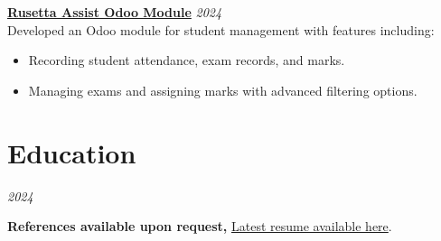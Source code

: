 \documentclass[letterpaper, 10pt]{article}
\begin{document}
\noindent\textbf{\href{https://github.com/mahmoudElshimi/rusetta_assist}{Rusetta Assist Odoo Module}} \hfill \textit{2024} \\
Developed an Odoo module for student management with features including:
\begin{itemize}[leftmargin=*]
    \item Recording student attendance, exam records, and marks.
    \item Managing exams and assigning marks with advanced filtering options.
\end{itemize}

\section*{Education}
\vspace{-0.3cm}
\hfill \textit{2024} 
\vspace{0.35cm}

\noindent \textbf{References available upon request,} \href{https://raw.githubusercontent.com/mahmoudElshimi/resume/main/mahmoud_elshimi_resume.pdf}{Latest resume available here}.
\end{document}

